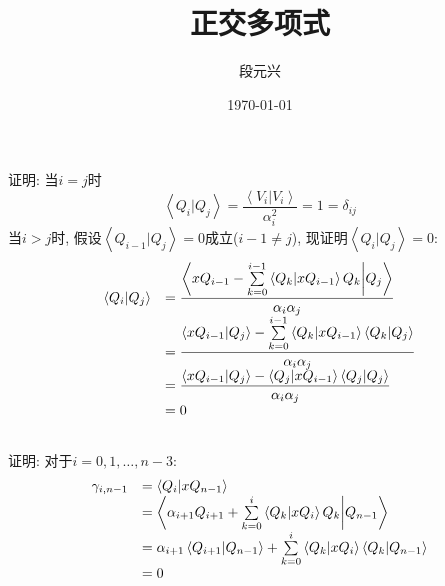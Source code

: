 \documentclass[UTF8]{ctexart}
\title{正交多项式}
\author{段元兴}
\date{\today}
\begin{document}
\maketitle
\thispagestyle{empty}
\setcounter{page}{1}
\newpage
\tableofcontents
\newpage
    \section{}
        \subsection{}
            \indent 证明: 当$i=j$时
            \begin{equation}
                \left<Q_i|Q_j\right>=\dfrac{\left<V_i|V_i\right>}{\alpha_i^2}=1=\delta_{ij}
            \end{equation}
            当$i>j$时, 假设$\left<Q_{i-1}|Q_j\right>=0$成立($i-1\neq j$), 现证明$\left<Q_i|Q_j\right>=0$:
            \begin{equation}
                \begin{array}{ll}
                \left<Q_i|Q_j\right>&=\dfrac{\left<xQ_{i-1}-\sum\limits_{k=0}^{i-1}\left<Q_k|xQ_{i-1}\right>Q_k\bigg{|}Q_j\right>}{\alpha_i\alpha_j}\\
                &=\dfrac{\left<xQ_{i-1}|Q_j\right>-\sum\limits_{k=0}^{i-1}\left<Q_k|xQ_{i-1}\right>\left<Q_k|Q_j\right>}{\alpha_i\alpha_j}\\
                &=\dfrac{\left<xQ_{i-1}|Q_j\right>-\left<Q_{j}|xQ_{i-1}\right>\left<Q_j|Q_j\right>}{\alpha_i\alpha_j}\\
                &=0\\
                \end{array}
            \end{equation}
        \subsection{}
            \indent 证明: 对于$i=0,1,\dots,n-3$:
            \begin{equation}
                \begin{array}{ll}
                    \gamma_{i,n-1}&=\left<Q_i|xQ_{n-1}\right>\\
                    &=\left<\alpha_{i+1}Q_{i+1}+\sum\limits_{k=0}^i\left<Q_k|xQ_i\right>Q_k\bigg{|}Q_{n-1}\right>\\
                    &=\alpha_{i+1}\left<Q_{i+1}|Q_{n-1}\right>+\sum\limits_{k=0}^i\left<Q_k|xQ_i\right>\left<Q_k|Q_{n-1}\right>\\
                    &=0\\
                \end{array}
            \end{equation}
\end{document}
